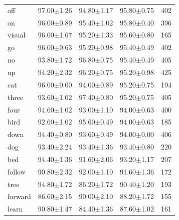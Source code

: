 \begin{table}[h]
\begin{tabular}{lcccc}
		off       &  97.00$\pm$1.26 &  94.80$\pm$1.17 &  95.80$\pm$0.75 &     402 \\
		on        &  96.00$\pm$0.89 &  95.40$\pm$1.02 &  95.80$\pm$0.40 &     396 \\
		visual    &  96.00$\pm$1.67 &  95.20$\pm$1.33 &  95.60$\pm$0.80 &     165 \\
		go        &  96.00$\pm$0.63 &  95.20$\pm$0.98 &  95.40$\pm$0.49 &     402 \\
		no        &  93.80$\pm$1.72 &  96.80$\pm$0.75 &  95.40$\pm$0.49 &     405 \\
		up        &  94.20$\pm$2.32 &  96.20$\pm$0.75 &  95.20$\pm$0.98 &     425 \\
		cat       &  96.00$\pm$0.00 &  94.00$\pm$0.89 &  95.20$\pm$0.75 &     194 \\
		three     &  93.60$\pm$1.02 &  97.40$\pm$0.80 &  95.20$\pm$0.75 &     405 \\
		four      &  94.60$\pm$1.02 &  93.00$\pm$1.10 &  94.00$\pm$0.63 &     400 \\
		bird      &  92.60$\pm$1.02 &  95.60$\pm$0.49 &  94.00$\pm$0.63 &     185 \\
		down      &  94.40$\pm$0.80 &  93.60$\pm$0.49 &  94.00$\pm$0.00 &     406 \\
		dog       &  93.40$\pm$2.24 &  93.40$\pm$1.36 &  93.40$\pm$0.80 &     220 \\
		bed       &  94.40$\pm$1.36 &  91.60$\pm$2.06 &  93.20$\pm$1.17 &     207 \\
		follow    &  90.80$\pm$2.32 &  92.00$\pm$1.10 &  91.60$\pm$1.36 &     172 \\
		tree      &  94.80$\pm$1.72 &  86.20$\pm$1.72 &  90.40$\pm$1.20 &     193 \\
		forward   &  86.60$\pm$2.15 &  90.00$\pm$2.10 &  88.20$\pm$1.72 &     155 \\
		learn     &  90.80$\pm$1.47 &  84.40$\pm$1.36 &  87.60$\pm$1.02 &     161 \\
		\bottomrule
	\end{tabular}

\end{table}


